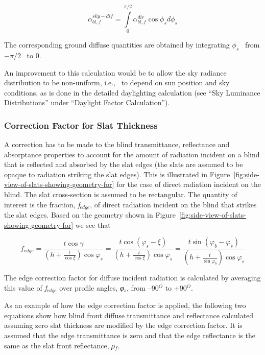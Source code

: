 \begin{equation}
\alpha_{bl,f}^{sky - dif} = \int\limits_0^{\pi /2} {\alpha_{bl,f}^{dir}\cos {\phi_s}d{\phi_s}}
\end{equation}

The corresponding ground diffuse quantities are obtained by integrating \({\phi_s}\) ~from \(- \pi /2\) ~to 0.

An improvement to this calculation would be to allow the sky radiance distribution to be non-uniform, i.e.,~ to depend on sun position and sky conditions, as is done in the detailed daylighting calculation (see ``Sky Luminance Distributions'' under ``Daylight Factor Calculation'').

\subsubsection{Correction Factor for Slat Thickness}\label{correction-factor-for-slat-thickness}

A correction has to be made to the blind transmittance, reflectance and absorptance properties to account for the amount of radiation incident on a blind that is reflected and absorbed by the slat edges (the slats are assumed to be opaque to radiation striking the slat edges). This is illustrated in Figure~\ref{fig:side-view-of-slats-showing-geometry-for} for the case of direct radiation incident on the blind. The slat cross-section is assumed to be rectangular. The quantity of interest is the fraction, \emph{f\(_{edge}\)}, of direct radiation incident on the blind that strikes the slat edges. Based on the geometry shown in Figure~\ref{fig:side-view-of-slats-showing-geometry-for} we see that

\begin{equation}
{f_{edge}} = \frac{{t\cos \gamma }}{{\left( {h + \frac{t}{{\cos \xi }}} \right)\cos {\varphi_s}}} = \frac{{t\cos ({\varphi_s} - \xi )}}{{\left( {h + \frac{t}{{\cos \xi }}} \right)\cos {\varphi_s}}} = \frac{{t\sin ({\varphi_b} - {\varphi_s})}}{{\left( {h + \frac{t}{{\sin {\varphi_b}}}} \right)\cos {\varphi_s}}}
\end{equation}

The edge correction factor for diffuse incident radiation is calculated by averaging this value of \emph{f\(_{edge}\)} over profile angles, \emph{φ\(_{s}\)}, from --90\(^{O}\) to +90\(^{O}\).

As an example of how the edge correction factor is applied, the following two equations show how blind front diffuse transmittance and reflectance calculated assuming zero slat thickness are modified by the edge correction factor. It is assumed that the edge transmittance is zero and that the edge reflectance is the same as the slat front reflectance, \emph{ρ\(_{f}\)}.

